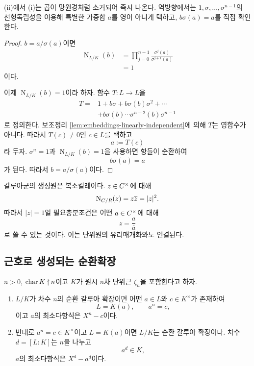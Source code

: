 \begin{proofidea}
(ii)에서 (i)는 곱이 망원경처럼 소거되어 즉시 나온다. 역방향에서는 $1,\sigma,\dots,\sigma^{n-1}$의 선형독립성을 이용해 특별한 가중합 $a$를 영이 아니게 택하고, $b\sigma(a)=a$를 직접 확인한다.
\end{proofidea}

\begin{proof}
$b=a/\sigma(a)$이면
\[
\begin{aligned}
  \operatorname N_{L/K}(b)
  &=\prod_{j=0}^{n-1}
    \frac{\sigma^j(a)}{\sigma^{j+1}(a)}\\
  &=1
\end{aligned}
\]
이다.

이제 $\operatorname N_{L/K}(b)=1$이라 하자. 함수 $T:L\to L$을
\[
\begin{aligned}
T={}&1+b\sigma+b\sigma(b)\sigma^2+\cdots\\
&+b\sigma(b)\cdots\sigma^{n-2}(b)\sigma^{n-1}
\end{aligned}
\]
로 정의한다. 보조정리 \ref{lem:embeddings-linearly-independent}에 의해 $T$는 영함수가 아니다. 따라서 $T(c)\ne0$인 $c\in L$를 택하고
\[
  a:=T(c)
\]
라 두자. $\sigma^n=1$과 $\operatorname N_{L/K}(b)=1$을 사용하면 항들이 순환하여
\[
  b\sigma(a)=a
\]
가 된다. 따라서 $b=a/\sigma(a)$이다.
\end{proof}

\begin{example}[$\C/\R$]
갈루아군의 생성원은 복소켤레이다. $z\in C^\times$에 대해
\[
  \operatorname N_{C/R}(z)=z\overline z=|z|^2.
\]
따라서 $|z|=1$일 필요충분조건은 어떤 $a\in C^\times$에 대해
\[
  z=\frac{a}{\overline a}
\]
로 쓸 수 있는 것이다. 이는 단위원의 유리매개화와도 연결된다.
\end{example}

\subsection{근호로 생성되는 순환확장}

\begin{theorem}[순환확장의 근호 표현]
\label{thm:cyclic-radical-characterization}
$n>0$, $\operatorname{char} K\nmid n$이고 $K$가 원시 $n$차 단위근 $\zeta_n$을 포함한다고 하자.
\begin{enumerate}[label=(\roman*)]
  \item $L/K$가 차수 $n$의 순환 갈루아 확장이면 어떤 $a\in L$와 $c\in K^\times$가 존재하여
  \[
    L=K(a),
    \qquad
    a^n=c,
  \]
  이고 $a$의 최소다항식은 $X^n-c$이다.
  \item 반대로 $a^n=c\in K^\times$이고 $L=K(a)$이면 $L/K$는 순환 갈루아 확장이다. 차수 $d=[L:K]$는 $n$을 나누고
  \[
    a^d\in K,
  \]
  $a$의 최소다항식은 $X^d-a^d$이다.
\end{enumerate}
\end{theorem}

